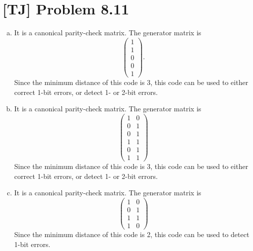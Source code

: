 \documentclass[a4paper,11pt,twocolumn]{article}
\begin{document}
  \section{[TJ] Problem 8.11}
  \begin{enumerate}[(a)]
    \item It is a canonical parity-check matrix. The generator matrix is
        $$ \begin{pmatrix} 1 \\ 1 \\ 0 \\ 0 \\ 1 \end{pmatrix}. $$
        Since the minimum distance of this code is 3, this code can be used to either correct 1-bit errors, or detect 1- or 2-bit errors.
    \item It is a canonical parity-check matrix. The generator matrix is
        $$ \begin{pmatrix} 1 & 0 \\ 0 & 1 \\ 0 & 1 \\ 1 & 1 \\ 0 & 1 \\ 1 & 1 \end{pmatrix} $$
        Since the minimum distance of this code is 3, this code can be used to either correct 1-bit errors, or detect 1- or 2-bit errors.
    \item It is a canonical parity-check matrix. The generator matrix is
        $$ \begin{pmatrix} 1 & 0 \\ 0 & 1 \\ 1 & 1 \\ 1 & 0 \end{pmatrix} $$
        Since the minimum distance of this code is 2, this code can be used to detect 1-bit errors.
  \end{enumerate}
  
\end{document}
